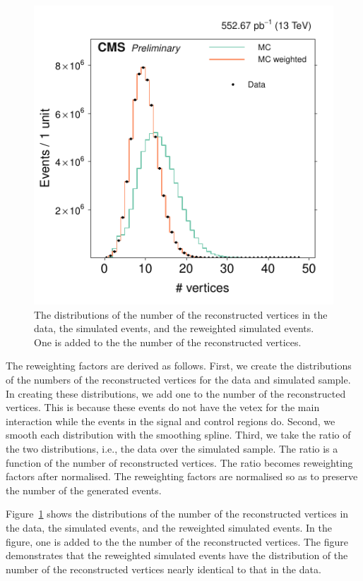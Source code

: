 \begin{figure}[!b]
\centering
\includegraphics[scale=1.00]{figures/pileup_reweighting/f042_corr_nVert_data_mc_norm}
\caption{The distributions of the number of the reconstructed vertices
in the data, the simulated events, and the reweighted simulated events.
One is added to the the number of the reconstructed vertices.}
\label{f042_corr_nVert_data_mc_norm}
\end{figure}

The reweighting factors are derived as follows. First, we create the
distributions of the numbers of the reconstructed vertices for the data
and simulated sample. In creating these distributions, we add one to the
number of the reconstructed vertices. This is because these events do
not have the vetex for the main interaction while the events in the
signal and control regions do. Second, we smooth each distribution with
the smoothing spline. Third, we take the ratio of the two distributions,
i.e., the data over the simulated sample. The ratio is a function of the
number of reconstructed vertices. The ratio becomes reweighting factors
after normalised. The reweighting factors are normalised so as to
preserve the number of the generated events.

Figure~\ref{f042_corr_nVert_data_mc_norm} shows the distributions of the
number of the reconstructed vertices in the data, the simulated events,
and the reweighted simulated events. In the figure, one is added to the
the number of the reconstructed vertices. The figure demonstrates that
the reweighted simulated events have the distribution of the number of
the reconstructed vertices nearly identical to that in the data.


